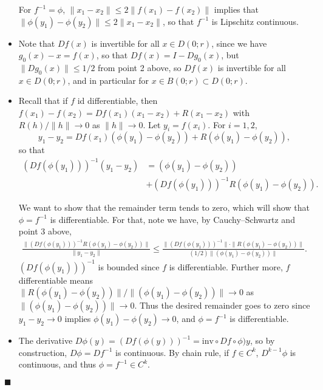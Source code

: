\documentclass[letter-paper]{tufte-book}
\newenvironment{proof}[1][Proof]{\begin{trivlist}
\item[\hskip \labelsep {\bfseries #1}]}{\end{trivlist}}
\newcommand{\qed}{\hfill$\blacksquare$}
\begin{document}
\begin{proof}
\begin{itemize}
    For $f^{-1} = \phi$, $\|x_1 - x_2\| \leq 2\|f(x_1) - f(x_2)\|$ implies that
    $\|\phi(y_1) - \phi(y_2)\| \leq 2\|x_1 - x_2\|$, so that $f^{-1}$ is
    Lipschitz continuous.
    
    \item Note that $Df(x)$ is invertible for all $x \in D(0; r)$, since we have
    $g_{0}(x) - x = f(x)$, so that $Df(x) = I - Dg_{0}(x)$, but $\|Dg_{0}(x)\|
    \leq 1/2$ from point 2 above, so $Df(x)$ is invertible for all $x \in
    D(0;r)$, and in particular for $x \in B(0; r) \subset D(0; r)$.
    
    \item Recall that if $f$ id differentiable, then $f(x_1) - f(x_2) =
    Df(x_1)(x_1 - x_2) + R(x_1 - x_2)$ with $R(h) / \|h\| \to 0$ as $\|h\| \to
    0$. Let $y_i = f(x_i)$. For $i=1,2$,
    \begin{equation*}
      y_1 - y_2 = Df(x_1)\left(\phi(y_1) - \phi(y_2)\right) + R\left(\phi(y_1) - \phi(y_2)\right),
    \end{equation*}
    so that
    \begin{align*}
      \left(Df(\phi(y_1))\right)^{-1}(y_1 - y_2) &= \left(\phi(y_1) - \phi(y_2)\right) \\
        &+\left(Df(\phi(y_1))\right)^{-1}R\left(\phi(y_1) - \phi(y_2)\right).
    \end{align*}
    
    We want to show that the remainder term tends to zero, which will show that
    $\phi = f^{-1}$ is differentiable. For that, note we have, by
    Cauchy--Schwartz and point 3 above,
    \begin{align*}
      \frac{\|\left(Df(\phi(y_1))\right)^{-1}R\left(\phi(y_1) - \phi(y_2)\right)\|}{\|y_1 - y_2\|} \leq  \frac{\|\left(Df(\phi(y_1))\right)^{-1}\|\cdot \|R\left(\phi(y_1) - \phi(y_2)\right)\|}{(1/2)\|\left(\phi(y_1) - \phi(y_2)\right)\|}.
    \end{align*}
    $\left(Df(\phi(y_1))\right)^{-1}$ is bounded since $f$ is differentiable.
    Further more, $f$ differentiable means $\|R\left(\phi(y_1) -
    \phi(y_2)\right)\| / \|\left(\phi(y_1) - \phi(y_2)\right)\| \to 0$ as
    $\|\left(\phi(y_1) - \phi(y_2)\right)\| \to 0$. Thus the desired remainder
    goes to zero since $y_1 - y_2 \to 0$ implies $\phi(y_1) - \phi(y_2) \to 0$,
    and $\phi = f^{-1}$ is differentiable.
    
    \item The derivative $D\phi(y) = (Df(\phi(y)))^{-1} = \mbox{inv} \circ Df
    \circ \phi)y$, so by construction, $D\phi = Df^{-1}$ is continuous. By chain
    rule, if $f\in C^k$, $D^{k-1}\phi$ is continuous, and thus $\phi = f^{-1}
    \in C^k$.
  \end{itemize}
  
   \qed
\end{proof}
\end{document}
